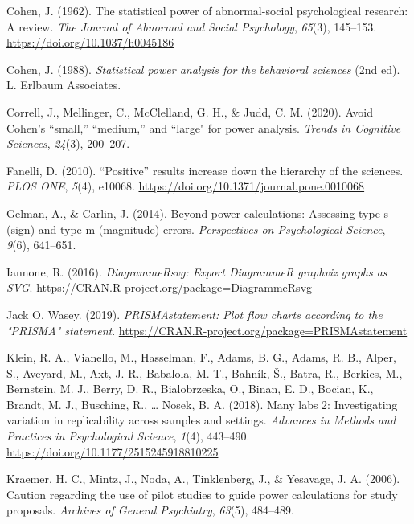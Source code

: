 \documentclass[
  doc, donotrepeattitle,floatsintext]{apa7}
\newlength{\cslhangindent}
\newlength{\cslentryspacingunit} %
\newenvironment{CSLReferences}[2] %
 {%
  \setlength{\parindent}{0pt}
  \ifodd #1
  \let\oldpar\par
  \def\par{\hangindent=\cslhangindent\oldpar}
  \fi
  \setlength{\parskip}{#2\cslentryspacingunit}
 }%
 {}
\begin{document}
\begin{CSLReferences}{1}{0}
\leavevmode{}%
Cohen, J. (1962). The statistical power of abnormal-social psychological research: A review. \emph{The Journal of Abnormal and Social Psychology}, \emph{65}(3), 145--153. \url{https://doi.org/10.1037/h0045186}

\leavevmode{}%
Cohen, J. (1988). \emph{Statistical power analysis for the behavioral sciences} (2nd ed). L. Erlbaum Associates.

\leavevmode{}%
Correll, J., Mellinger, C., McClelland, G. H., \& Judd, C. M. (2020). Avoid {C}ohen's {``small,''} {``medium,''} and ``large" for power analysis. \emph{Trends in Cognitive Sciences}, \emph{24}(3), 200--207.

\leavevmode{}%
Fanelli, D. (2010). {``Positive''} results increase down the hierarchy of the sciences. \emph{PLOS ONE}, \emph{5}(4), e10068. \url{https://doi.org/10.1371/journal.pone.0010068}

\leavevmode{}%
Gelman, A., \& Carlin, J. (2014). Beyond power calculations: Assessing type s (sign) and type m (magnitude) errors. \emph{Perspectives on Psychological Science}, \emph{9}(6), 641--651.

\leavevmode{}%
Iannone, R. (2016). \emph{DiagrammeRsvg: Export DiagrammeR graphviz graphs as SVG}. \url{https://CRAN.R-project.org/package=DiagrammeRsvg}

\leavevmode{}%
Jack O. Wasey. (2019). \emph{PRISMAstatement: Plot flow charts according to the "PRISMA" statement}. \url{https://CRAN.R-project.org/package=PRISMAstatement}

\leavevmode{}%
Klein, R. A., Vianello, M., Hasselman, F., Adams, B. G., Adams, R. B., Alper, S., Aveyard, M., Axt, J. R., Babalola, M. T., Bahník, Š., Batra, R., Berkics, M., Bernstein, M. J., Berry, D. R., Bialobrzeska, O., Binan, E. D., Bocian, K., Brandt, M. J., Busching, R., \ldots{} Nosek, B. A. (2018). Many labs 2: Investigating variation in replicability across samples and settings. \emph{Advances in Methods and Practices in Psychological Science}, \emph{1}(4), 443--490. \url{https://doi.org/10.1177/2515245918810225}

\leavevmode{}%
Kraemer, H. C., Mintz, J., Noda, A., Tinklenberg, J., \& Yesavage, J. A. (2006). Caution regarding the use of pilot studies to guide power calculations for study proposals. \emph{Archives of General Psychiatry}, \emph{63}(5), 484--489.


\end{CSLReferences}
\end{document}
